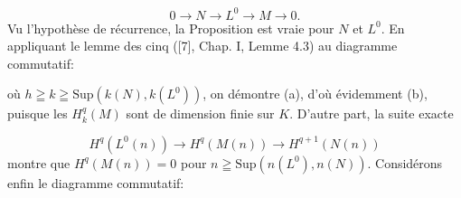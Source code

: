 \begin{equation*}
0 \to N \to L^0 \to M \to 0.
\end{equation*}
Vu l'hypothèse de récurrence, la Proposition est vraie pour $N$ et $L^0$. En appliquant le lemme des cinq ([7], Chap. I, Lemme 4.3) au diagramme commutatif:

\begin{center}
\end{center}
où $h \geqq k \geqq \mathrm{Sup}(k(N), k(L^0))$, on démontre (a), d'où évidemment (b), puisque les $H_k^q(M)$ sont de dimension finie sur $K$. D'autre part, la suite exacte

\begin{equation*}
H^q(L^0(n)) \to H^q(M(n)) \to H^{q+1}(N(n))
\end{equation*}
montre que $H^q(M(n)) = 0$ pour $n \geqq \mathrm{Sup}(n(L^0), n(N))$. Considérons enfin le diagramme commutatif:


